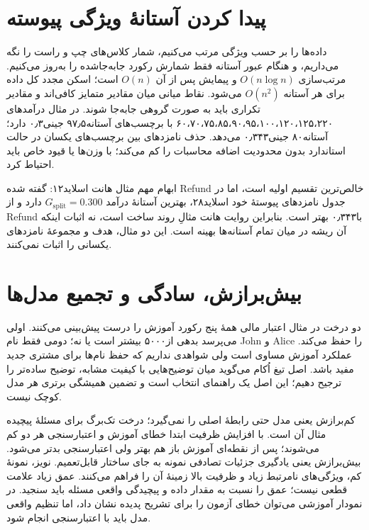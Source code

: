 \section{پیدا کردن آستانهٔ ویژگی پیوسته}

داده‌ها را بر حسب ویژگی مرتب می‌کنیم، شمار کلاس‌های چپ و راست را نگه می‌داریم، و هنگام عبور آستانه فقط شمارش رکورد جابه‌جا‌شده را به‌روز می‌کنیم. مرتب‌سازی $O(n\log n)$ و پیمایش پس از آن $O(n)$ است؛ اسکن مجدد کل داده برای هر آستانه $O(n^2)$ می‌شود. نقاط میانی میان مقادیر متمایز کافی‌اند و مقادیر تکراری باید به صورت گروهی جابه‌جا شوند. در مثال درآمدهای ۶۰،۷۰،۷۵،۸۵،۹۰،۹۵،۱۰۰،۱۲۰،۱۲۵،۲۲۰ با برچسب‌های  آستانه۹۷٫۵ جینی۰٫۳ دارد؛ آستانه۸۰ جینی۰٫۳۴۳ می‌دهد. حذف نامزدهای بین برچسب‌های یکسان در حالت استاندارد بدون محدودیت اضافه محاسبات را کم می‌کند؛ با وزن‌ها یا قیود خاص باید احتیاط کرد.

ابهام مهم مثال هانت اسلاید۱۲: گفته شده Refund خالص‌ترین تقسیم اولیه است، اما در جدول نامزدهای پیوستهٔ خود اسلاید۲۸، بهترین آستانهٔ درآمد $G_{\mathrm{split}}=0.300$ دارد و از Refund با۰٫۳۴۳ بهتر است. بنابراین روایت هانت مثالِ روند ساخت است، نه اثبات اینکه آن ریشه در میان تمام آستانه‌ها بهینه است. این دو مثال، هدف و مجموعهٔ نامزدهای یکسانی را اثبات نمی‌کنند.



\section{بیش‌برازش، سادگی و تجمیع مدل‌ها}

دو درخت در مثال اعتبار مالی همهٔ پنج رکورد آموزش را درست پیش‌بینی می‌کنند. اولی می‌پرسد بدهی از۵۰۰۰ بیشتر است یا نه؛ دومی فقط نام John و Alice را حفظ می‌کند. عملکرد آموزش مساوی است ولی شواهدی نداریم که حفظ نام‌ها برای مشتری جدید مفید باشد. اصل تیغ اُکام می‌گوید میان توضیح‌هایی با کیفیت مشابه، توضیح ساده‌تر را ترجیح دهیم؛ این اصل یک راهنمای انتخاب است و تضمین همیشگی برتری هر مدل کوچک نیست.

کم‌برازش یعنی مدل حتی رابطهٔ اصلی را نمی‌گیرد؛ درخت تک‌برگ برای مسئلهٔ پیچیده مثال آن است. با افزایش ظرفیت ابتدا خطای آموزش و اعتبارسنجی هر دو کم می‌شوند؛ پس از نقطه‌ای آموزش باز هم بهتر ولی اعتبارسنجی بدتر می‌شود. بیش‌برازش یعنی یادگیری جزئیات تصادفی نمونه به جای ساختار قابل‌تعمیم. نویز، نمونهٔ کم، ویژگی‌های نامرتبط زیاد و ظرفیت بالا زمینهٔ آن را فراهم می‌کنند. عمق زیاد علامت قطعی نیست؛ عمق را نسبت به مقدار داده و پیچیدگی واقعی مسئله باید سنجید. در نمودار آموزشی می‌توان خطای آزمون را برای تشریح پدیده نشان داد، اما تنظیم واقعی مدل باید با اعتبارسنجی انجام شود.

